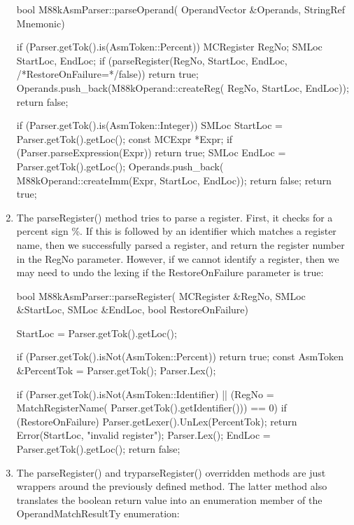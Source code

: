 \begin{enumerate}
\begin{cpp}
bool M88kAsmParser::parseOperand(
        OperandVector &Operands, StringRef Mnemonic) {
    if (Parser.getTok().is(AsmToken::Percent)) {
        MCRegister RegNo;
        SMLoc StartLoc, EndLoc;
        if (parseRegister(RegNo, StartLoc, EndLoc,
                        /*RestoreOnFailure=*/false))
            return true;
        Operands.push_back(M88kOperand::createReg(
            RegNo, StartLoc, EndLoc));
        return false;
    }

    if (Parser.getTok().is(AsmToken::Integer)) {
        SMLoc StartLoc = Parser.getTok().getLoc();
        const MCExpr *Expr;
        if (Parser.parseExpression(Expr))
            return true;
        SMLoc EndLoc = Parser.getTok().getLoc();
        Operands.push_back(
            M88kOperand::createImm(Expr, StartLoc, EndLoc));
        return false;
    }
    return true;
}
\end{cpp}

\item
The parseRegister() method tries to parse a register. First, it checks for a percent sign \%. If this is followed by an identifier which matches a register name, then we successfully parsed a register, and return the register number in the RegNo parameter. However, if we cannot identify a register, then we may need to undo the lexing if the RestoreOnFailure parameter is true:

\begin{cpp}
bool M88kAsmParser::parseRegister(
        MCRegister &RegNo, SMLoc &StartLoc, SMLoc &EndLoc,
        bool RestoreOnFailure) {
    StartLoc = Parser.getTok().getLoc();

    if (Parser.getTok().isNot(AsmToken::Percent))
        return true;
    const AsmToken &PercentTok = Parser.getTok();
    Parser.Lex();

    if (Parser.getTok().isNot(AsmToken::Identifier) ||
        (RegNo = MatchRegisterName(
            Parser.getTok().getIdentifier())) == 0) {
        if (RestoreOnFailure)
            Parser.getLexer().UnLex(PercentTok);
        return Error(StartLoc, "invalid register");
    }
    Parser.Lex();
    EndLoc = Parser.getTok().getLoc();
    return false;
}
\end{cpp}

\item
The parseRegister() and tryparseRegister() overridden methods are just wrappers around the previously defined method. The latter method also translates the boolean return value into an enumeration member of the OperandMatchResultTy enumeration:


\end{enumerate}

